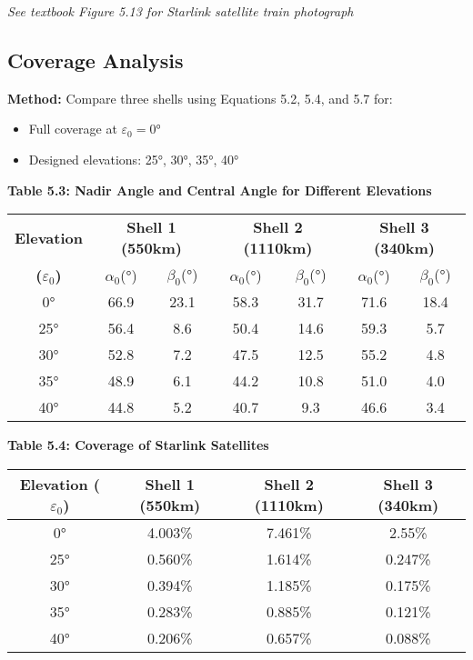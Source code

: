 \documentclass[11pt,letterpaper]{article}
\begin{document}
\textit{See textbook Figure 5.13 for Starlink satellite train photograph}

\subsection{Coverage Analysis}

\textbf{Method:} Compare three shells using Equations 5.2, 5.4, and 5.7 for:
\begin{itemize}
    \item Full coverage at $\varepsilon_0 = 0°$
    \item Designed elevations: 25°, 30°, 35°, 40°
\end{itemize}

\textbf{Table 5.3: Nadir Angle and Central Angle for Different Elevations}

\begin{center}
\begin{tabular}{|c|cc|cc|cc|}
\hline
\textbf{Elevation} & \multicolumn{2}{c|}{\textbf{Shell 1 (550km)}} & \multicolumn{2}{c|}{\textbf{Shell 2 (1110km)}} & \multicolumn{2}{c|}{\textbf{Shell 3 (340km)}} \\
\textbf{($\varepsilon_0$)} & $\alpha_0$(°) & $\beta_0$(°) & $\alpha_0$(°) & $\beta_0$(°) & $\alpha_0$(°) & $\beta_0$(°) \\
\hline
0° & 66.9 & 23.1 & 58.3 & 31.7 & 71.6 & 18.4 \\
25° & 56.4 & 8.6 & 50.4 & 14.6 & 59.3 & 5.7 \\
30° & 52.8 & 7.2 & 47.5 & 12.5 & 55.2 & 4.8 \\
35° & 48.9 & 6.1 & 44.2 & 10.8 & 51.0 & 4.0 \\
40° & 44.8 & 5.2 & 40.7 & 9.3 & 46.6 & 3.4 \\
\hline
\end{tabular}
\end{center}

\textbf{Table 5.4: Coverage of Starlink Satellites}

\begin{center}
\begin{tabular}{|c|c|c|c|}
\hline
\textbf{Elevation ($\varepsilon_0$)} & \textbf{Shell 1 (550km)} & \textbf{Shell 2 (1110km)} & \textbf{Shell 3 (340km)} \\
\hline
0° & 4.003\% & 7.461\% & 2.55\% \\
25° & 0.560\% & 1.614\% & 0.247\% \\
30° & 0.394\% & 1.185\% & 0.175\% \\
35° & 0.283\% & 0.885\% & 0.121\% \\
40° & 0.206\% & 0.657\% & 0.088\% \\
\hline
\end{tabular}
\end{center}
\end{document}
